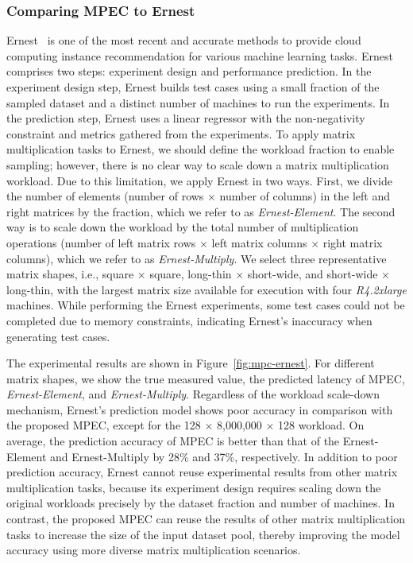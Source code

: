 \documentclass[10pt, conference, compsocconf]{IEEEtran}
\begin{document}
\subsubsection{Comparing MPEC to Ernest}
Ernest~\cite{ernest} is one of the most recent and accurate methods to provide cloud computing instance recommendation for various machine learning tasks. Ernest comprises two steps: experiment design and performance prediction. In the experiment design step, Ernest builds test cases using a small fraction of the sampled dataset and a distinct number of machines to run the experiments. In the prediction step, Ernest uses a linear regressor with the non-negativity constraint and metrics gathered from the experiments. To apply matrix multiplication tasks to Ernest, we should define the workload fraction to enable sampling; however, there is no clear way to scale down a matrix multiplication workload. Due to this limitation, we apply Ernest in two ways. First, we divide the number of elements (number of rows $\times$ number of columns) in the left and right matrices by the fraction, which we refer to as \textit{Ernest-Element}. The second way is to scale down the workload by the total number of multiplication operations (number of left matrix rows $\times$ left matrix columns $\times$ right matrix columns), which we refer to as \textit{Ernest-Multiply}. We select three representative matrix shapes, i.e., square $\times$ square, long-thin $\times$ short-wide, and short-wide $\times$ long-thin, with the largest matrix size available for execution with four \textit{R4.2xlarge} machines. While performing the Ernest experiments, some test cases could not be completed due to memory constraints, indicating Ernest's inaccuracy when generating test cases.

The experimental results are shown in Figure~\ref{fig:mpc-ernest}. For different matrix shapes, we show the true measured value, the predicted latency of MPEC, \textit{Ernest-Element}, and \textit{Ernest-Multiply}. Regardless of the workload scale-down mechanism, Ernest's prediction model shows poor accuracy in comparison with the proposed MPEC, except for the 128 $\times$ 8,000,000 $\times$ 128 workload. On average, the prediction accuracy of MPEC is better than that of the Ernest-Element and Ernest-Multiply by 28\% and 37\%, respectively. In addition to poor prediction accuracy, Ernest cannot reuse experimental results from other matrix multiplication tasks, because its experiment design requires scaling down the original workloads precisely by the dataset fraction and number of machines. In contrast, the proposed MPEC can reuse the results of other matrix multiplication tasks to increase the size of the input dataset pool, thereby improving the model accuracy using more diverse matrix multiplication scenarios.
\end{document}
